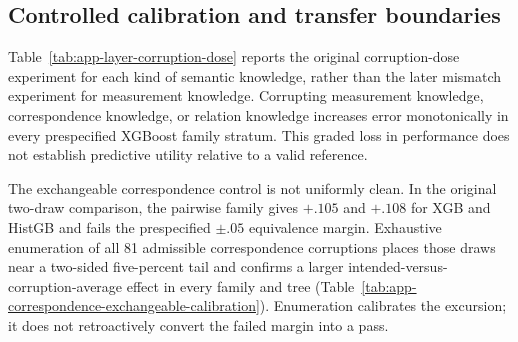 
\subsection{Controlled calibration and transfer boundaries}
\label{sec:app-controlled-boundaries}

Table~\ref{tab:app-layer-corruption-dose} reports the original corruption-dose
experiment for each kind of semantic knowledge, rather than the later mismatch
experiment for measurement knowledge.  Corrupting measurement knowledge,
correspondence knowledge, or relation knowledge increases error
monotonically in every prespecified XGBoost family stratum.  This graded loss in
performance does not establish predictive utility relative to a valid reference.

The exchangeable correspondence control is not uniformly clean.  In the
original two-draw comparison, the pairwise family gives $+.105$ and $+.108$
for XGB and HistGB and fails the prespecified $\pm.05$ equivalence margin.
Exhaustive enumeration of all 81 admissible correspondence corruptions places
those draws near a two-sided five-percent tail and confirms a larger
intended-versus-corruption-average
effect in every family and tree
(Table~\ref{tab:app-correspondence-exchangeable-calibration}).  Enumeration
calibrates the excursion; it does not retroactively convert the failed margin
into a pass.


